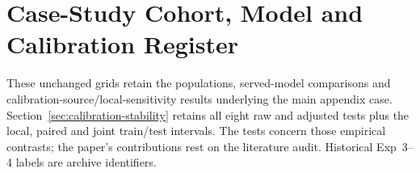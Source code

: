 \section{Case-Study Cohort, Model and Calibration Register}\label{sec:case-study-register}
These unchanged grids retain the populations, served-model comparisons and calibration-source/local-sensitivity results underlying the main appendix case. Section~\ref{sec:calibration-stability} retains all eight raw and adjusted tests plus the local, paired and joint train/test intervals. The tests concern those empirical contrasts; the paper's contributions rest on the literature audit. Historical Exp~3--4 labels are archive identifiers.

\begingroup\makeatletter
\renewenvironment{table}[1][]{\par\medskip\noindent\begin{minipage}{\textwidth}\def\@captype{table}\centering}{\end{minipage}\par\medskip}
\renewenvironment{table*}[1][]{\par\medskip\noindent\begin{minipage}{\textwidth}\def\@captype{table}\centering}{\end{minipage}\par\medskip}
\makeatother



\endgroup

